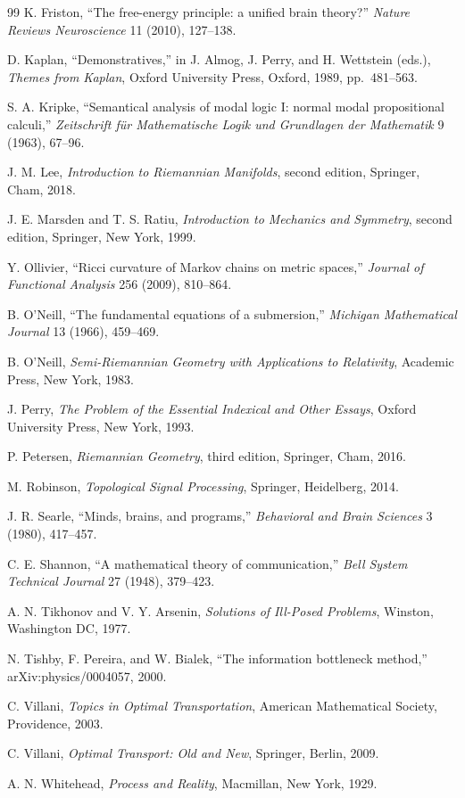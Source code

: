 \documentclass[12pt, oneside]{book}
\theoremstyle{plain-flyxion}
\theoremstyle{definition-flyxion}
\begin{document}
\begin{thebibliography}{99}
K. Friston,
``The free-energy principle: a unified brain theory?''
\textit{Nature Reviews Neuroscience} 11 (2010), 127--138.

D. Kaplan,
``Demonstratives,''
in J. Almog, J. Perry, and H. Wettstein (eds.),
\textit{Themes from Kaplan},
Oxford University Press, Oxford, 1989, pp.~481--563.

S. A. Kripke,
``Semantical analysis of modal logic I: normal modal propositional calculi,''
\textit{Zeitschrift f\"ur Mathematische Logik und Grundlagen der Mathematik} 9 (1963),
67--96.

J. M. Lee,
\textit{Introduction to Riemannian Manifolds}, second edition,
Springer, Cham, 2018.

J. E. Marsden and T. S. Ratiu,
\textit{Introduction to Mechanics and Symmetry}, second edition,
Springer, New York, 1999.

Y. Ollivier,
``Ricci curvature of Markov chains on metric spaces,''
\textit{Journal of Functional Analysis} 256 (2009), 810--864.

B. O'Neill,
``The fundamental equations of a submersion,''
\textit{Michigan Mathematical Journal} 13 (1966), 459--469.

B. O'Neill,
\textit{Semi-Riemannian Geometry with Applications to Relativity},
Academic Press, New York, 1983.

J. Perry,
\textit{The Problem of the Essential Indexical and Other Essays},
Oxford University Press, New York, 1993.

P. Petersen,
\textit{Riemannian Geometry}, third edition,
Springer, Cham, 2016.

M. Robinson,
\textit{Topological Signal Processing},
Springer, Heidelberg, 2014.

J. R. Searle,
``Minds, brains, and programs,''
\textit{Behavioral and Brain Sciences} 3 (1980), 417--457.

C. E. Shannon,
``A mathematical theory of communication,''
\textit{Bell System Technical Journal} 27 (1948), 379--423.

A. N. Tikhonov and V. Y. Arsenin,
\textit{Solutions of Ill-Posed Problems},
Winston, Washington DC, 1977.

N. Tishby, F. Pereira, and W. Bialek,
``The information bottleneck method,''
arXiv:physics/0004057, 2000.

C. Villani,
\textit{Topics in Optimal Transportation},
American Mathematical Society, Providence, 2003.

C. Villani,
\textit{Optimal Transport: Old and New},
Springer, Berlin, 2009.

A. N. Whitehead,
\textit{Process and Reality},
Macmillan, New York, 1929.

\end{thebibliography}
\end{document}
